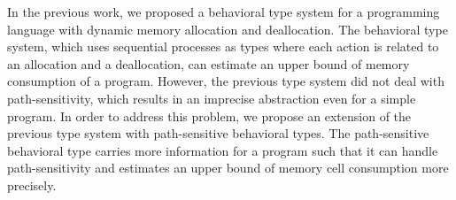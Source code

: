 \label{sec:abstraction}
In the previous work, we proposed a behavioral type system for a
programming language with dynamic memory allocation and deallocation.
The behavioral type system, which uses sequential processes as types
where each action is related to an allocation and a deallocation, can
estimate an upper bound of memory consumption of a program.  However,
the previous type system did not deal with path-sensitivity, which
results in an imprecise abstraction even for a simple program.  In
order to address this problem, we propose an extension of the previous
type system with path-sensitive behavioral types.  The path-sensitive
behavioral type carries more information for a program such that it
can handle path-sensitivity and estimates an upper bound of memory cell
consumption more precisely.

